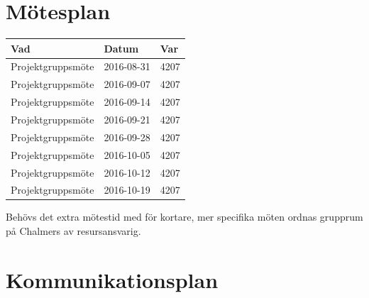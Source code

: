 \documentclass[a4paper]{article}
\begin{document}
\section{Mötesplan}

\begin{tabular}{|l|l|l|} \hline
\bf Vad           & \bf Datum  & \bf Var \\ \hline \hline
Projektgruppsmöte & 2016-08-31 &    4207 \\ \hline
Projektgruppsmöte & 2016-09-07 &    4207 \\ \hline
Projektgruppsmöte & 2016-09-14 &    4207 \\ \hline
Projektgruppsmöte & 2016-09-21 &    4207 \\ \hline
Projektgruppsmöte & 2016-09-28 &    4207 \\ \hline
Projektgruppsmöte & 2016-10-05 &    4207 \\ \hline
Projektgruppsmöte & 2016-10-12 &    4207 \\ \hline
Projektgruppsmöte & 2016-10-19 &    4207 \\ \hline
\end{tabular}

\vspace{5mm}
\noindent Behövs det extra mötestid med för kortare, mer specifika möten ordnas grupprum på Chalmers av resursansvarig.



\section{Kommunikationsplan}
\end{document}
